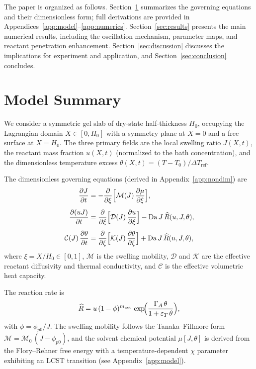 \documentclass[aps,pre,reprint,superscriptaddress,longbibliography,floatfix]{revtex4-2}
\newcommand{\Ms}{\mathcal{M}}
\newcommand{\Ds}{\mathcal{D}}
\newcommand{\Cs}{\mathcal{C}}
\newcommand{\Ks}{\mathcal{K}}
\newcommand{\Da}{\mathrm{Da}}
\newcommand{\Rhat}{\widehat{R}}
\begin{document}
The paper is organized as follows. Section~\ref{sec:model} summarizes the
governing equations and their dimensionless form; full derivations are
provided in Appendices~\ref{app:model}--\ref{app:numerics}. 
Section~\ref{sec:results} presents the main numerical results, including
the oscillation mechanism, parameter maps, and reactant penetration
enhancement. Section~\ref{sec:discussion} discusses the implications for
experiment and application, and Section~\ref{sec:conclusion} concludes.

\section{Model Summary}
\label{sec:model}

We consider a symmetric gel slab of dry-state half-thickness $H_0$,
occupying the Lagrangian domain $X\in[0,H_0]$ with a symmetry plane at
$X=0$ and a free surface at $X=H_0$. The three primary fields are the
local swelling ratio $J(X,t)$, the reactant mass fraction $u(X,t)$ (normalized
to the bath concentration), and the dimensionless temperature excess
$\theta(X,t) = (T-T_0)/\Delta T_\mathrm{ref}$.

The dimensionless governing equations (derived in Appendix~\ref{app:nondim})
are
\begin{subequations}
\label{eq:governing}
\begin{align}
  \frac{\partial J}{\partial t} &= -\frac{\partial}{\partial \xi}
    \Bigl[\Ms(J)\,\frac{\partial\mu}{\partial\xi}\Bigr], \label{eq:gov_J}\\[4pt]
  \frac{\partial (uJ)}{\partial t} &= \frac{\partial}{\partial\xi}
    \Bigl[\Ds(J)\,\frac{\partial u}{\partial\xi}\Bigr]
    - \Da\,J\,\Rhat(u,J,\theta), \label{eq:gov_u}\\[4pt]
  \Cs(J)\,\frac{\partial\theta}{\partial t} &= \frac{\partial}{\partial\xi}
    \Bigl[\Ks(J)\,\frac{\partial\theta}{\partial\xi}\Bigr]
    + \Da\,J\,\Rhat(u,J,\theta), \label{eq:gov_theta}
\end{align}
\end{subequations}
where $\xi=X/H_0\in[0,1]$, $\Ms$ is the swelling mobility, $\Ds$ and $\Ks$
are the effective reactant diffusivity and thermal conductivity, and $\Cs$
is the effective volumetric heat capacity.

The reaction rate is
\begin{equation}
  \Rhat = u\,(1-\phi)^{m_\mathrm{act}}\,
  \exp\!\Bigl(\frac{\Gamma_A\,\theta}{1+\varepsilon_T\,\theta}\Bigr),
  \label{eq:rxn}
\end{equation}
with $\phi = \phi_{p0}/J$. The swelling mobility follows the Tanaka--Fillmore
form $\Ms = \Ms_0\,(J-\phi_{p0})$, and the solvent chemical potential
$\mu[J,\theta]$ is derived from the Flory--Rehner free energy with a
temperature-dependent $\chi$ parameter exhibiting an LCST transition
(see Appendix~\ref{app:model}).
\end{document}

